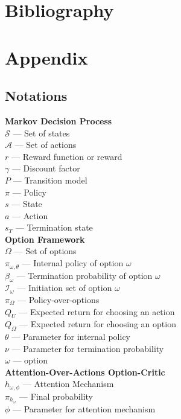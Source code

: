 \documentclass{article}
\begin{document}
	\section{Bibliography}
	
	
	\section{Appendix}
	\subsection*{Notations}
	{\bfseries Markov Decision Process}\\
	$\mathcal{S}$ --- Set of states\\
	$\mathcal{A}$ --- Set of actions\\
	$r$ --- Reward function or reward\\
	$\gamma$ --- Discount factor\\
	$P$ --- Transition model\\
	$\pi$ --- Policy\\
	$s$ --- State\\
	$a$ --- Action\\
	$s_T$ --- Termination state\\
	{\bfseries Option Framework}\\
	$\Omega$ --- Set of options\\
	$\pi_{\omega,\theta}$ --- Internal policy of option $\omega$\\
	$\beta_\omega$ --- Termination probability of option $\omega$\\
	$\mathcal{I}_\omega$ --- Initiation set of option $\omega$\\
	$\pi_\Omega$ --- Policy-over-options\\
	$Q_U$ --- Expected return for choosing an action\\
	$Q_\Omega$ --- Expected return for choosing an option\\
	$\theta$ --- Parameter for internal policy\\
	$\nu$ --- Parameter for termination probability\\
	$\omega$ --- option\\
	{\bfseries Attention-Over-Actions Option-Critic}\\
	$h_{\omega,\phi}$ --- Attention Mechanism\\
	$\pi_{h_\omega}$ --- Final probability\\
	$\phi$ --- Parameter for attention mechanism\\
\end{document}
